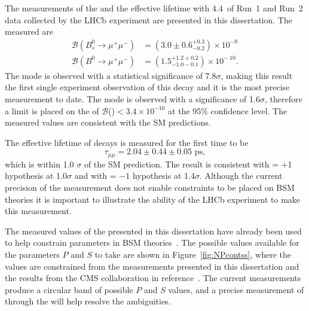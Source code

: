 The measurements of the \bmumu \BF and the \bsmumu effective lifetime with 4.4~\fb of Run~1 and Run~2 data collected by the LHCb experiment are presented in this dissertation. The measured \BFs are
\begin{equation}
\begin{split}
  \mathcal{B}(B^{0}_{s} \to \mu^{+} \mu^{-}) &= (3.0 \pm 0.6^{+0.3}_{-0.2}) \times 10^{-9\
} \\
  \mathcal{B}(B^{0} \to \mu^{+} \mu^{-}) &= (1.5^{+1.2 +0.2}_{-1.0 -0.1})    \times 10^{-\
10}.
\end{split}
\label{eq:BFresults2}
\end{equation}
The \bs mode is observed with a statistical significance of 7.8$\sigma$, making this result the first single experiment observation of this decay and it is the most precise measurement to date. The \bd mode is observed with a significance of 1.6$\sigma$, therefore a limit is placed on the \BF of $\mathcal{B}$(\bdmumu)$ < 3.4 \times 10^{-10}$ at the 95$\%$ confidence level. The measured values are consistent with the SM predictions. %


The effective lifetime of \bsmumu decays is measured for the first time to be 
\begin{equation}
\tau_{\mu\mu} = 2.04 \pm 0.44 \pm 0.05 \text{ ps},
\end{equation}
which is within 1.0 $\sigma$ of the SM prediction. The result is consistent with \ADG = +1 hypothesis at 1.0$\sigma$ and with \ADG = $-1$ hypothesis at 1.4$\sigma$. Although the current precision of the measurement does not enable constraints to be placed on BSM theories it is important to illustrate the ability of the LHCb experiment to make this measurement.

The measured values of the \BF presented in this dissertation have already been used to help constrain parameters in BSM theories~\cite{Altmannshofer:2017wqy,Fleischer:2017ltw,Bobeth:2017xry,Chiang:2017etj}. 
The possible values available for the parameters $P$ and $S$ to take are shown in Figure~\ref{fig:NPcontss}, where the values are constrained from the measurements presented in this dissertation and the results from the CMS collaboration in reference~\cite{Chatrchyan:2013bka}. The current measurements produce a circular band of possible $P$ and $S$ values, and a precise measurement of \ADG through the \bsmumu \el will help resolve the ambiguities.


